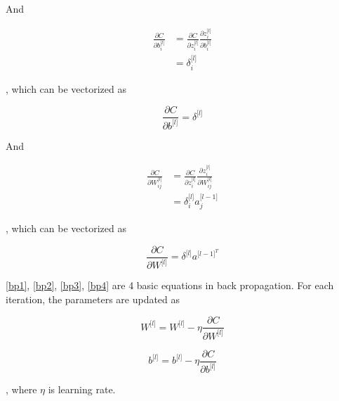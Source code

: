 \documentclass[11pt]{scrartcl} %
\begin{document}
And

\begin{equation}
\begin{split}
\frac{\partial C}{\partial b_i^{\lbrack l\rbrack}} &=\frac{\partial C}{\partial z_i^{\lbrack l\rbrack}}\frac{\partial z_i^{\lbrack l\rbrack}}{\partial b_i^{\lbrack l\rbrack}} \\
&=\delta_i^{\lbrack l\rbrack}
\end{split}
\end{equation}

, which can be vectorized as 

\begin{equation}
\frac{\partial C}{\partial b^{\lbrack l\rbrack}}=\delta^{\lbrack l\rbrack}
\label{bp3}
\end{equation}

And

\begin{equation}
\begin{split}
\frac{\partial C}{\partial W_{ij}^{\lbrack l\rbrack}}&=\frac{\partial C}{\partial z_i^{\lbrack l\rbrack}}\frac{\partial z_i^{\lbrack l\rbrack}}{\partial W_{ij}^{\lbrack l\rbrack}} \\
&=\delta_i^{\lbrack l\rbrack}a_j^{\lbrack l-1\rbrack}
\end{split}
\end{equation}

, which can be vectorized as 

\begin{equation}
\frac{\partial C}{\partial W^{\lbrack l\rbrack}}=\delta^{\lbrack l\rbrack}a^{{\lbrack l-1\rbrack}^T}
\label{bp4}
\end{equation}

\eqref{bp1}, \eqref{bp2}, \eqref{bp3}, \eqref{bp4} are 4 basic equations in back propagation. For each iteration, the parameters are updated as 

\begin{equation}
W^{\lbrack l\rbrack}=W^{\lbrack l\rbrack}-\eta \frac{\partial C}{\partial W^{\lbrack l\rbrack}}
\label{bp5}
\end{equation}

\begin{equation}
b^{\lbrack l\rbrack}=b^{\lbrack l\rbrack}-\eta \frac{\partial C}{\partial b^{\lbrack l\rbrack}}
\label{bp6}
\end{equation}

, where $\eta$ is learning rate.
\end{document}
